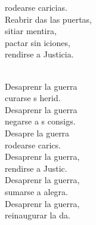 \begin{cancion}
\begin{chorus}
	rodearse  caricias. \\
	Reabrir das las puertas, \\
	sitiar  mentira, \\
	pactar sin iciones,\\
	rendirse a  Justicia.\\
	\end{chorus}%
	\jump\\
	Desaprenr la guerra\\
	curarse s herid. \\
	Desaprenr la guerra\\
	negarse a s consigs. \\
	Desapre la guerra\\
	rodearse  carics. \\
	Desaprenr la guerra,\\
	rendirse a  Justic. \\
	Desaprenr la guerra,\\
	sumarse a  alegra. \\
	Desaprenr la guerra,\\
	reinaugurar la da. \\
\end{cancion}%
